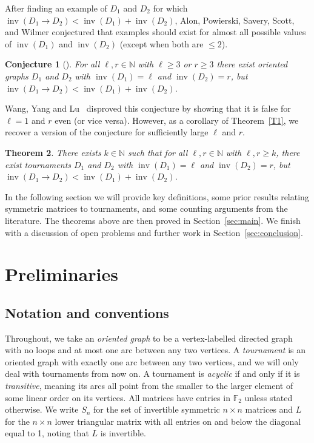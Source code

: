 \documentclass[a4paper, 12pt, reqno]{amsart}
\numberwithin{equation}{section}
\theoremstyle{plain}
\newtheorem{thm}{Theorem}[section]
\newtheorem{conjecture}[thm]{Conjecture}
\theoremstyle{remark}
\theoremstyle{definition}
\newcommand{\inv}{\operatorname{inv}}
\begin{document}
\bigskip

After finding an example of $D_1$ and $D_2$ for which $\inv(D_1\rightarrow D_2) < \inv(D_1) + \inv(D_2)$, Alon, Powierski, Savery, Scott, and Wilmer \cite{Alon} conjectured that examples should exist for almost all possible values of $\inv(D_1)$ and $\inv(D_2)$ (except when both are $\le 2$).
\begin{conjecture}[]
    For all $\ell ,r\in \mathbb{N}$ with $\ell \geq 3$ or $r\geq 3$ there exist oriented graphs $D_1$ and $D_2$ with $\inv(D_1) =\ell$ and $\inv(D_2) =r$, but $\inv(D_1\rightarrow D_2)< \inv(D_1) + \inv(D_2)$.
\end{conjecture}
Wang, Yang and Lu~\cite{Wang} disproved this conjecture by showing that it is false for $\ell=1$ and $r$ even (or vice versa). However, as a corollary of Theorem~\ref{T1}, we recover a version of the conjecture for sufficiently large $\ell$ and $r$.
\begin{thm}\label{thm:all_ell_r}
    There exists $k \in \mathbb{N}$ such that for all $\ell ,r\in \mathbb{N}$ with $\ell,r \geq k$, there exist tournaments $D_1$ and $D_2$ with $\inv(D_1) =\ell$ and $\inv(D_2) =r$, but $\inv(D_1\rightarrow D_2)< \inv(D_1) + \inv(D_2)$. 
\end{thm}


In the following section we will provide key definitions, some prior results relating symmetric matrices to tournaments, and some counting arguments from the literature. The theorems above are then proved in Section~\ref{sec:main}. We finish with a discussion of open problems and further work in Section~\ref{sec:conclusion}.



\section{Preliminaries}

\subsection{Notation and conventions}
  Throughout, we take an \emph{oriented graph} to be a vertex-labelled directed graph with no loops and at most one arc between any two vertices. A \emph{tournament} is an oriented graph with exactly one arc between any two vertices, and we will only deal with tournaments from now on. A tournament is \emph{acyclic} if and only if it is \emph{transitive}, meaning its arcs all point from the smaller to the larger element of some linear order on its vertices. All matrices have entries in $\mathbb{F}_2$ unless stated otherwise. We write $S_n$ for the set of invertible symmetric $n \times n$ matrices and $L$ for the $n \times n$ lower triangular matrix with all entries on and below the diagonal equal to 1, noting that $L$ is invertible. 
  
\end{document}
